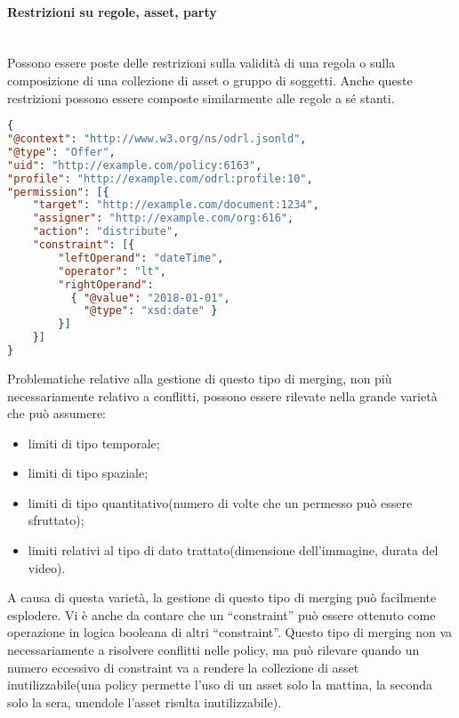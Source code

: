 \documentclass[12pt,a4paper,twoside]{book}
\begin{document}
\paragraph{Restrizioni su regole, asset, party}\mbox{}\\
Possono essere poste delle restrizioni sulla validità di una regola o sulla composizione di una collezione di asset o gruppo di soggetti. Anche queste restrizioni possono essere composte similarmente alle regole a sé stanti.\newpage
\begin{lstlisting}[language=json,firstnumber=1,caption={Esempio di limite temporale per una regola, può essere composto similarmente ai limiti sull'azione regolata},captionpos=b]
{
"@context": "http://www.w3.org/ns/odrl.jsonld",
"@type": "Offer",
"uid": "http://example.com/policy:6163",
"profile": "http://example.com/odrl:profile:10",
"permission": [{
	"target": "http://example.com/document:1234",
	"assigner": "http://example.com/org:616",
	"action": "distribute",
	"constraint": [{
		"leftOperand": "dateTime",
		"operator": "lt",
		"rightOperand": 
		  { "@value": "2018-01-01",
		    "@type": "xsd:date" }
		}]
	}]
}
\end{lstlisting}
Problematiche relative alla gestione di questo tipo di merging, non più necessariamente relativo a conflitti, possono essere rilevate nella grande varietà che può assumere:
\begin{itemize}
	\item limiti di tipo temporale;
	\item limiti di tipo spaziale;
	\item limiti di tipo quantitativo(numero di volte che un permesso può essere sfruttato);
	\item limiti relativi al tipo di dato trattato(dimensione dell'immagine, durata del video).
\end{itemize}
A causa di questa varietà, la gestione di questo tipo di merging può facilmente esplodere. Vi è anche da contare che un ``constraint'' può essere ottenuto come operazione in logica booleana di altri ``constraint''. Questo tipo di merging non va necessariamente a risolvere conflitti nelle policy, ma può rilevare quando un numero eccessivo di constraint va a rendere la collezione di asset inutilizzabile(una policy permette l'uso di un asset solo la mattina, la seconda solo la sera, unendole l'asset risulta inutilizzabile).
\end{document}
